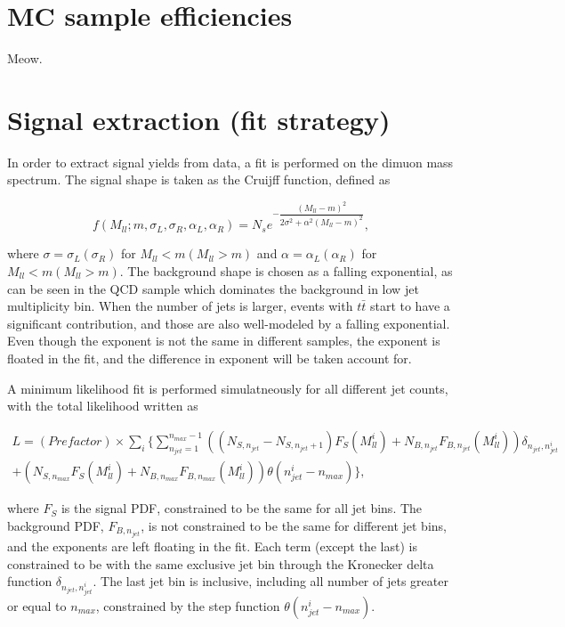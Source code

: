 \documentclass[10pt,a4paper,onecolumn]{	article}
\begin{document}
\section{MC sample efficiencies}

Meow.

\section{Signal extraction (fit strategy)}

In order to extract signal yields from data, a fit is performed on the dimuon mass spectrum.
The signal shape is taken as the Cruijff function, defined as

\begin{equation}
f(M_{ll}; m, \sigma_L, \sigma_R, \alpha_L, \alpha_R) = N_s e^{-\dfrac{(M_{ll} - m)^2}{2 \sigma^2 + \alpha^2 (M_{ll} - m)^2}},\nonumber
\end{equation}

where $\sigma = \sigma_L (\sigma_R)$ for $M_{ll} < m (M_{ll} > m)$ and $\alpha = \alpha_L (\alpha_R)$ for $M_{ll} < m (M_{ll} > m)$.
The background shape is chosen as a falling exponential, as can be seen in the QCD sample which dominates the background in low
jet multiplicity bin.  When the number of jets is larger, events with $t\bar{t}$ start to have a significant contribution, and those are
also well-modeled by a falling exponential.
Even though the exponent is not the same in different samples, the exponent is floated in the fit, and the difference in exponent will be taken account for.

A minimum likelihood fit is performed simulatneously for all different jet counts, with the total likelihood written as

\begin{eqnarray}
L = (Prefactor) \times \displaystyle\sum_i \{ \displaystyle\sum_{n_{jet}=1}^{n_{max} - 1} \left( (N_{S, n_{jet}} - N_{S, n_{jet} + 1}) F_S(M_{ll}^i) + N_{B, n_{jet}} F_{B, n_{jet}}(M_{ll}^i) \right)
\delta_{n_{jet}, n_{jet}^i}\nonumber\\
+ \left( N_{S, n_{max}} F_S(M_{ll}^i) + N_{B, n_{max}} F_{B, n_{max}}(M_{ll}^i) \right) \theta(n_{jet}^i - n_{max}) \},
\nonumber
\end{eqnarray}

where $F_S$ is the signal PDF, constrained to be the same for all jet bins.  The background PDF, $F_{B, n_{jet}}$, is not constrained to
be the same for different jet bins, and the exponents are left floating in the fit.  Each term (except the last) is constrained to be with the same exclusive jet bin
through the Kronecker delta function $\delta_{n_{jet}, n_{jet}^i}$.
The last jet bin is inclusive, including all number of jets greater or equal to $n_{max}$, constrained by the step function $\theta(n_{jet}^i - n_{max})$.
\end{document}
